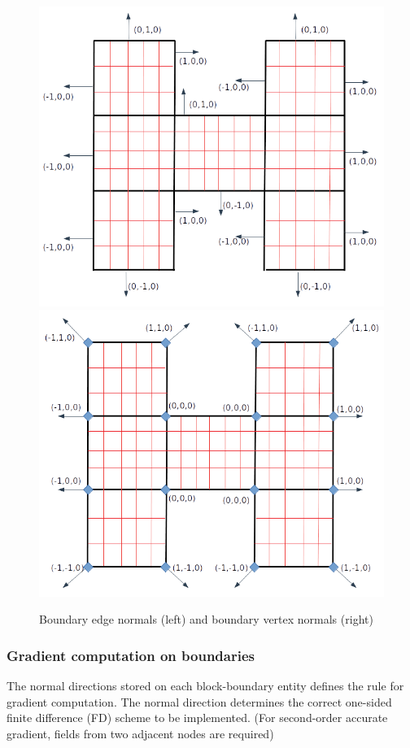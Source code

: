 \documentclass[a4paper,12pt]{article}
\begin{document}
\begin{figure}[H]
	\centering
	\includegraphics[scale=0.33]{figures/EdgeBdryNrml.png}
	\includegraphics[scale=0.33]{figures/VertBdryNrml.png}
	\caption{Boundary edge normals (left) and boundary vertex normals (right)}
\end{figure}

\subsubsection{Gradient computation on boundaries}
The normal directions stored on each block-boundary entity defines the rule for gradient computation. The normal direction determines the correct one-sided finite difference (FD) scheme to be implemented. (For second-order accurate gradient, fields from two adjacent nodes are required) 
\end{document}
